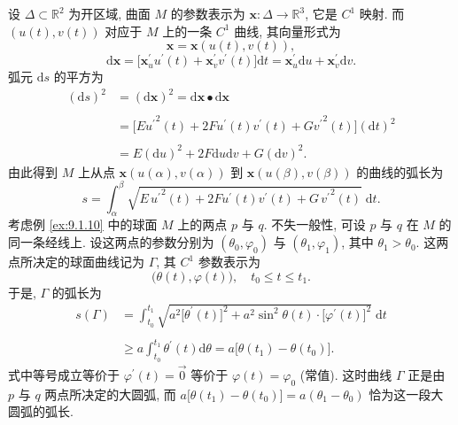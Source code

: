 \begin{example}\label{ex:9.1.14}
设 $\Delta \subset \mathbb{R}^{2}$ 为开区域, 曲面 $M$ 的参数表示为 $\boldsymbol{x}\colon \Delta \to \mathbb{R}^{3}$, 它是 $C^{1}$ 映射. 而 $(u(t), v(t))$ 对应于 $M$ 上的一条 $C^{1}$ 曲线, 其向量形式为
\[
  \boldsymbol{x} = \boldsymbol{x}(u(t), v(t)),
\]
\[
  \mathrm{d}\boldsymbol{x} = \bigl[\boldsymbol{x}_{u}^{\prime}u^{\prime}(t) + \boldsymbol{x}_{v}^{\prime}v^{\prime}(t)\bigr]\mathrm{d}t
  = \boldsymbol{x}_{u}^{\prime}\mathrm{d}u + \boldsymbol{x}_{v}^{\prime}\mathrm{d}v.
\]
弧元 $\mathrm{d}s$ 的平方为
\begin{align*}
  (\mathrm{d}s)^{2} &= (\mathrm{d}\boldsymbol{x})^{2} = \mathrm{d}\boldsymbol{x}\bullet\mathrm{d}\boldsymbol{x} \\\\
  &= \bigl[E{u^{\prime}}^{2}(t) + 2Fu^{\prime}(t)v^{\prime}(t) + G{v^{\prime}}^{2}(t)\bigr](\mathrm{d}t)^{2} \\\\
  &= E(\mathrm{d}u)^{2} + 2F\mathrm{d}u\mathrm{d}v + G(\mathrm{d}v)^{2}.
\end{align*}
由此得到 $M$ 上从点 $\boldsymbol{x}(u(\alpha), v(\alpha))$ 到 $\boldsymbol{x}(u(\beta), v(\beta))$ 的曲线的弧长为
\[
  s = \int_{\alpha}^{\beta}\sqrt{E\,{u^{\prime}}^{2}(t) + 2Fu^{\prime}(t)v^{\prime}(t) + G\,{v^{\prime}}^{2}(t)}\;\mathrm{d}t.
\]
考虑例 \ref{ex:9.1.10} 中的球面 $M$ 上的两点 $p$ 与 $q$. 不失一般性, 可设 $p$ 与 $q$ 在 $M$ 的同一条经线上. 设这两点的参数分别为 $(\theta_{0}, \varphi_{0})$ 与 $(\theta_{1}, \varphi_{1})$, 其中 $\theta_{1} > \theta_{0}$. 这两点所决定的球面曲线记为 $\Gamma$, 其 $C^{1}$ 参数表示为
\[
  \bigl(\theta(t), \varphi(t)\bigr), \quad t_{0} \leqslant t \leqslant t_{1}.
\]
于是, $\Gamma$ 的弧长为
\begin{align*}
  s(\Gamma) &= \int_{t_{0}}^{t_{1}}\sqrt{a^{2}\bigl[\theta^{\prime}(t)\bigr]^{2} + a^{2}\sin^{2}\theta(t) \cdot \bigl[\varphi^{\prime}(t)\bigr]^{2}}\;\mathrm{d}t \\\\
  &\geqslant a\int_{t_{0}}^{t_{1}}\theta^{\prime}(t)\mathrm{d}\theta
  = a\bigl[\theta(t_{1}) - \theta(t_{0})\bigr].
\end{align*}
式中等号成立等价于 $\varphi^{\prime}(t) = \vec{0}$ 等价于 $\varphi(t) = \varphi_{0}$ (常值). 这时曲线 $\Gamma$ 正是由 $p$ 与 $q$ 两点所决定的大圆弧, 而
$  a\bigl[\theta(t_{1}) - \theta(t_{0})\bigr] = a(\theta_{1} - \theta_{0})$ 恰为这一段大圆弧的弧长.
\end{example}


